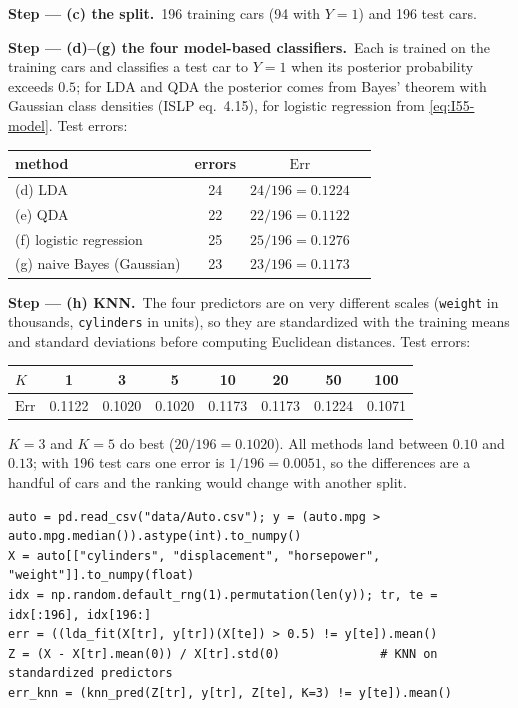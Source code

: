 \documentclass[11pt,a4paper]{article}
\numberwithin{equation}{questao}   %
\newcommand{\passo}[2]{\par\smallskip\noindent\textbf{Step --- #1.}~#2}
\begin{document}
\begin{sol}
\passo{(c) the split}{196 training cars (94 with $Y=1$) and 196 test cars.}

\passo{(d)--(g) the four model-based classifiers}{Each is trained on the training cars and
classifies a test car to $Y=1$ when its posterior probability exceeds $0.5$; for LDA and QDA the
posterior comes from Bayes' theorem with Gaussian class densities (ISLP eq.~4.15), for logistic
regression from \eqref{eq:I55-model}. Test errors:
\begin{center}\begin{tabular}{lccc}\toprule
method & errors & $\mathrm{Err}$\\\midrule
(d) LDA & 24 & $24/196=0.1224$\\
(e) QDA & 22 & $22/196=0.1122$\\
(f) logistic regression & 25 & $25/196=0.1276$\\
(g) naive Bayes (Gaussian) & 23 & $23/196=0.1173$\\\bottomrule\end{tabular}\end{center}}

\passo{(h) KNN}{The four predictors are on very different scales (\texttt{weight} in thousands,
\texttt{cylinders} in units), so they are standardized with the training means and standard
deviations before computing Euclidean distances. Test errors:
\begin{center}\begin{tabular}{lccccccc}\toprule
$K$ & 1 & 3 & 5 & 10 & 20 & 50 & 100\\\midrule
$\mathrm{Err}$ & 0.1122 & 0.1020 & 0.1020 & 0.1173 & 0.1173 & 0.1224 & 0.1071\\\bottomrule\end{tabular}\end{center}
$K=3$ and $K=5$ do best ($20/196=0.1020$). All methods land between $0.10$ and $0.13$; with 196 test
cars one error is $1/196=0.0051$, so the differences are a handful of cars and the ranking would
change with another split.}

\begin{lstlisting}
auto = pd.read_csv("data/Auto.csv"); y = (auto.mpg > auto.mpg.median()).astype(int).to_numpy()
X = auto[["cylinders", "displacement", "horsepower", "weight"]].to_numpy(float)
idx = np.random.default_rng(1).permutation(len(y)); tr, te = idx[:196], idx[196:]
err = ((lda_fit(X[tr], y[tr])(X[te]) > 0.5) != y[te]).mean()
Z = (X - X[tr].mean(0)) / X[tr].std(0)              # KNN on standardized predictors
err_knn = (knn_pred(Z[tr], y[tr], Z[te], K=3) != y[te]).mean()
\end{lstlisting}


\end{sol}
\end{document}
